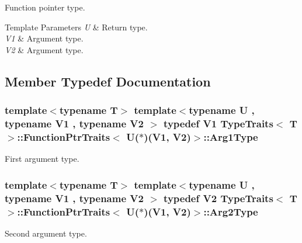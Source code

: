 Function pointer type. 
\begin{DoxyTemplParams}{Template Parameters}
{\em U} & Return type. \\
\hline
{\em V1} & Argument type. \\
\hline
{\em V2} & Argument type. \\
\hline
\end{DoxyTemplParams}


\subsection{Member Typedef Documentation}
\subsubsection[{\texorpdfstring{Arg1\+Type}{Arg1Type}}]{\setlength{\rightskip}{0pt plus 5cm}template$<$typename T$>$ template$<$typename U , typename V1 , typename V2 $>$ typedef V1 {\bf Type\+Traits}$<$ T $>$\+::{\bf Function\+Ptr\+Traits}$<$ U($\ast$)(V1, V2)$>$\+::{\bf Arg1\+Type}}\hypertarget{structTypeTraits_1_1FunctionPtrTraits_3_01U_07_5_08_07V1_00_01V2_08_4_a928b76d110f8abcf9d1374aa9cbfea23}{}\label{structTypeTraits_1_1FunctionPtrTraits_3_01U_07_5_08_07V1_00_01V2_08_4_a928b76d110f8abcf9d1374aa9cbfea23}
First argument type. 
\subsubsection[{\texorpdfstring{Arg2\+Type}{Arg2Type}}]{\setlength{\rightskip}{0pt plus 5cm}template$<$typename T$>$ template$<$typename U , typename V1 , typename V2 $>$ typedef V2 {\bf Type\+Traits}$<$ T $>$\+::{\bf Function\+Ptr\+Traits}$<$ U($\ast$)(V1, V2)$>$\+::{\bf Arg2\+Type}}\hypertarget{structTypeTraits_1_1FunctionPtrTraits_3_01U_07_5_08_07V1_00_01V2_08_4_a7b0cf45deee3970a093f931e0d0c3b36}{}\label{structTypeTraits_1_1FunctionPtrTraits_3_01U_07_5_08_07V1_00_01V2_08_4_a7b0cf45deee3970a093f931e0d0c3b36}
Second argument type. 
